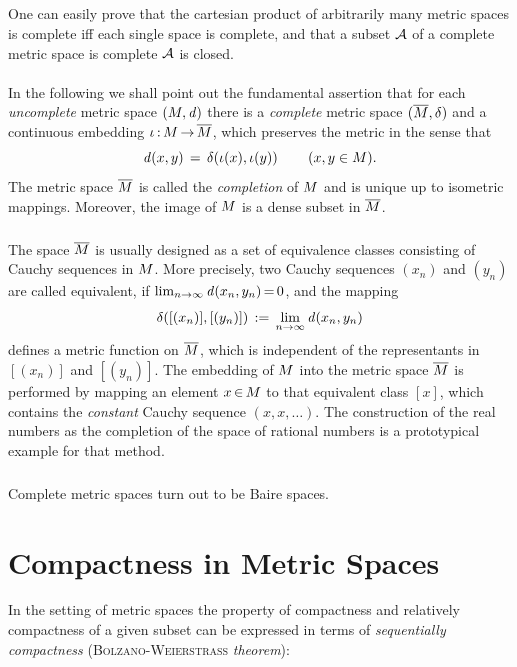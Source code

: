 \documentclass[11pt,twoside]{article}
\begin{document}
\subparagraph{}
One can easily prove
that the cartesian product of arbitrarily many metric spaces is complete
iff each single space is complete,
and that a subset ${\mathcal{A}}$ of a complete metric space is complete
\iff ${\mathcal{A}}$ is closed.

\paragraph{}
In the following we shall point out the fundamental assertion
that for each \textit{uncomplete} metric space $(M,\mathit{d})$
there is a \textit{complete} metric space $(\overline{M},\delta)$ and
a continuous embedding $\iota {\,:\,} M {\,\to\,} \overline{M}$,
which preserves the metric in the sense that
\[
\mathit{d}(x,y) \,=\, \delta(\iota(x),\iota(y))
\quad \, \quad (x,y \in M).
\]
The metric space $\overline{M}$ is called the \textit{completion}
of $M$ and is unique up to isometric mappings.
Moreover,
the image of $M$ is a dense subset in $\overline{M}$.

\subparagraph{}
The space $\overline{M}$ is usually designed as
a set of equivalence classes consisting of Cauchy sequences in $M$.
More precisely,
two Cauchy sequences $(x_n)$ and $(y_n)$ are called equivalent,
if $\lim_{n \to \infty} \mathit{d}(x_n,y_n) {\,=\,} 0$,
and the mapping
\[
\delta([(x_n)],[(y_n)]) \,:=\, \lim_{n \to \infty} \mathit{d}(x_n,y_n)
\]
defines a metric function on $\overline{M}$,
which is independent of the representants in $[(x_n)]$ and $[(y_n)]$.
The embedding of $M$ into the metric space $\overline{M}$
is performed by mapping an element $x {\,\in\,} M$
to that equivalent class $[x]$,
which contains the \textit{constant} Cauchy sequence $(x,x,\ldots)$.
The construction of the real numbers as the completion of the space
of rational numbers is a prototypical example for that method.

\subparagraph{}
Complete metric spaces turn out to be Baire spaces.

\section{Compactness in Metric Spaces}                                         %
In the setting of metric spaces 
the property of compactness and relatively compactness of a given subset
can be expressed in terms of \textit{sequentially compactness}
(\textsc{Bolzano-Weierstrass} \textit{theorem}):
\end{document}
